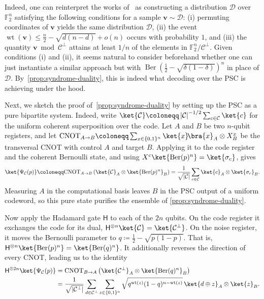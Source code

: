 \documentclass[11pt]{article}
\renewcommand{\leq}{\leqslant}
\theoremstyle{remark}
\newcommand{\ketbra}[2]{\ket{#1}\!\bra{#2}}
\newcommand{\cC}{\mathcal{C}}
\newcommand{\cD}{\mathcal{D}}
\newcommand{\F}{\mathbb{F}}
\newcommand{\Ber}{\operatorname{Ber}}
\newcommand{\wt}{\operatorname{wt}}
\newcommand{\bits}{\{0,1\}}
\newcommand{\abs}[1]{\left|#1\right|}
\begin{document}
Indeed, one can reinterpret the works of~\cite{FT05,NS09} as constructing a distribution $\cD$ over $\F_2^n$ satisfying the following conditions for a sample $\mathbf{v} \sim \cD$: (i) permuting coordinates of $\mathbf{v}$ yields the same distribution $\cD$, (ii) the event $\wt(\mathbf{v}) \leq \frac{n}{2}-\sqrt{d(n-d)}+o(n)$ occurs with probability $1$, and (iii) the quantity $\mathbf{v} \bmod{\cC^\perp}$ attains at least $1/n$ of the elements in $\F_2^n/\cC^\perp$. Given conditions (i) and (ii), it seems natural to consider beforehand whether one can just instantiate a similar approach but with $\Ber(\frac{1}{2}-\sqrt{\delta(1-\delta)})^n$ in place of $\cD$. By~\cref{prop:syndrome-duality}, this is indeed what decoding over the PSC is achieving under the hood.

Next, we sketch the proof of~\cref{prop:syndrome-duality} by setting up the PSC as a pure bipartite system. Indeed, write $\ket{\cC} \coloneqq \abs{\cC}^{-1/2}\sum_{c \in \cC}{\ket{c}}$ for the uniform coherent superposition over the code. Let $A$ and $B$ be two $n$-qubit registers, and let $\mathrm{CNOT}_{A \to B} \coloneqq \sum_{x \in \bits^n}{\ketbra{x}{x}_A \otimes X^x_B}$ be the transversal CNOT with control $A$ and target $B$. Applying it to the code register and the coherent Bernoulli state, and using $X^c\ket{\Ber(p)^n} = \ket{\sigma_c}$, gives
\begin{equation}
\label{eq:psc-bipartite}
\ket{\Psi_{\cC}(p)}
\coloneqq \mathrm{CNOT}_{A \to B}\left(\ket{\cC}_A \otimes \ket{\Ber(p)^n}_B\right)
=\frac{1}{\sqrt{\abs{\cC}}}\sum_{c \in \cC}{\ket{c}_A \otimes \ket{\sigma_c}_B}.
\end{equation}
Measuring $A$ in the computational basis leaves $B$ in the PSC output of a uniform codeword, so this pure state purifies the ensemble of \cref{prop:syndrome-duality}.

Now apply the Hadamard gate $\mathsf{H}$ to each of the $2n$ qubits. On the code register it exchanges the code for its dual, $\mathsf{H}^{\otimes n}\ket{\cC} = \ket{\cC^\perp}$. On the noise register, it moves the Bernoulli parameter to $q \coloneqq \frac{1}{2}-\sqrt{p(1-p)}$. That is, $\mathsf{H}^{\otimes n}\ket{\Ber(p)^n} = \ket{\Ber(q)^n}$. It additionally reverses the direction of every CNOT, leading us to the identity
\begin{equation}
\label{eq:psc-bipartite-dual}
\begin{split}
\mathsf{H}^{\otimes 2n}\ket{\Psi_{\cC}(p)}
&=\mathrm{CNOT}_{B \to A}\left(\ket{\cC^\perp}_A \otimes \ket{\Ber(q)^n}_B\right) \\
&=\frac{1}{\sqrt{\abs{\cC^\perp}}}\sum_{d \in \cC^\perp}{\sum_{z \in \bits^n}{\sqrt{q^{\wt(z)}(1-q)^{n-\wt(z)}}\,\ket{d \oplus z}_A \otimes \ket{z}_B}}.
\end{split}
\end{equation}
\end{document}
